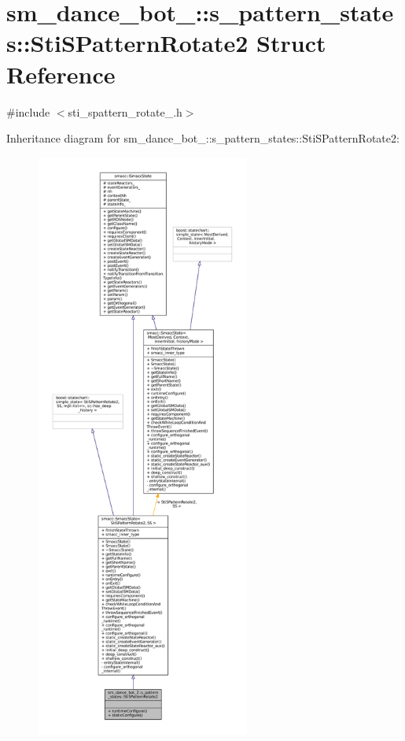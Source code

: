 \hypertarget{structsm__dance__bot__2_1_1s__pattern__states_1_1StiSPatternRotate2}{}\section{sm\+\_\+dance\+\_\+bot\+\_\+:\+:s\+\_\+pattern\+\_\+states\+:\+:Sti\+S\+Pattern\+Rotate2 Struct Reference}
\label{structsm__dance__bot__2_1_1s__pattern__states_1_1StiSPatternRotate2}


{\ttfamily \#include $<$sti\+\_\+spattern\+\_\+rotate\+\_.\+h$>$}



Inheritance diagram for sm\+\_\+dance\+\_\+bot\+\_\+:\+:s\+\_\+pattern\+\_\+states\+:\+:Sti\+S\+Pattern\+Rotate2\+:
\nopagebreak
\begin{figure}[H]
\begin{center}
\leavevmode
\includegraphics[height=550pt]{structsm__dance__bot__2_1_1s__pattern__states_1_1StiSPatternRotate2__inherit__graph}
\end{center}
\end{figure}


